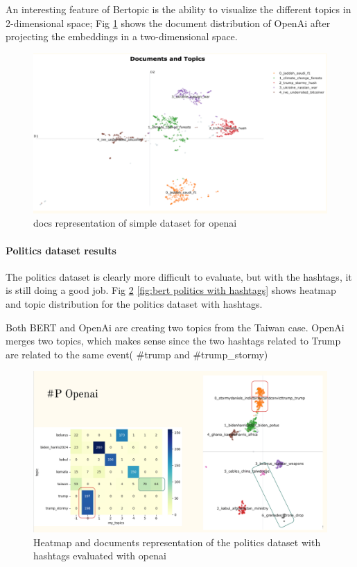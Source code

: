 An interesting feature of Bertopic is the ability to visualize the different topics in 2-dimensional space; Fig \ref{fig:openai docs} shows the document distribution of OpenAi after projecting the embeddings in a two-dimensional space.

\begin{figure}
    \centering
    \includegraphics[width=1\linewidth]{Chapter4/figures/openai_documents_viz.png}
    \caption{docs representation of simple dataset for openai}
    \label{fig:openai docs}
\end{figure}


\paragraph{Politics dataset results}

The politics dataset is clearly more difficult to evaluate, but with the hashtags, it is still doing a good job. Fig \ref{fig:openai_heat_docs_politics_hash} \ref{fig:bert politics with hashtags} shows heatmap and topic distribution for the politics dataset with hashtags.

 Both BERT and OpenAi are creating two topics from the Taiwan case. OpenAi merges two topics, which makes sense since the two hashtags related to Trump are related to the same event( \#trump and \#trump\_stormy) 

\begin{figure}
    \centering
    \includegraphics[width=1\linewidth]{Chapter4/figures/openai_politics_hash_comparison.png}
    \caption{Heatmap and documents representation of the politics dataset with hashtags evaluated with openai}
    \label{fig:openai_heat_docs_politics_hash}
\end{figure}

